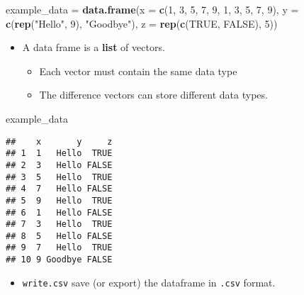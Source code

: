 \documentclass[]{book}
\newenvironment{Shaded}{\begin{snugshade}}{\end{snugshade}}
\newcommand{\DataTypeTok}[1]{\textcolor[rgb]{0.13,0.29,0.53}{#1}}
\newcommand{\DecValTok}[1]{\textcolor[rgb]{0.00,0.00,0.81}{#1}}
\newcommand{\KeywordTok}[1]{\textcolor[rgb]{0.13,0.29,0.53}{\textbf{#1}}}
\newcommand{\NormalTok}[1]{#1}
\newcommand{\OtherTok}[1]{\textcolor[rgb]{0.56,0.35,0.01}{#1}}
\newcommand{\StringTok}[1]{\textcolor[rgb]{0.31,0.60,0.02}{#1}}
\providecommand{\tightlist}{%
  \setlength{\itemsep}{0pt}\setlength{\parskip}{0pt}}
\begin{document}
\begin{Shaded}
\begin{Highlighting}[]
\NormalTok{example_data =}\StringTok{ }\KeywordTok{data.frame}\NormalTok{(}\DataTypeTok{x =} \KeywordTok{c}\NormalTok{(}\DecValTok{1}\NormalTok{, }\DecValTok{3}\NormalTok{, }\DecValTok{5}\NormalTok{, }\DecValTok{7}\NormalTok{, }\DecValTok{9}\NormalTok{, }\DecValTok{1}\NormalTok{, }\DecValTok{3}\NormalTok{, }\DecValTok{5}\NormalTok{, }\DecValTok{7}\NormalTok{, }\DecValTok{9}\NormalTok{),}
                          \DataTypeTok{y =} \KeywordTok{c}\NormalTok{(}\KeywordTok{rep}\NormalTok{(}\StringTok{"Hello"}\NormalTok{, }\DecValTok{9}\NormalTok{), }\StringTok{"Goodbye"}\NormalTok{),}
                          \DataTypeTok{z =} \KeywordTok{rep}\NormalTok{(}\KeywordTok{c}\NormalTok{(}\OtherTok{TRUE}\NormalTok{, }\OtherTok{FALSE}\NormalTok{), }\DecValTok{5}\NormalTok{))}
\end{Highlighting}
\end{Shaded}

\begin{itemize}
\tightlist
\item
  A data frame is a \textbf{list} of vectors.

  \begin{itemize}
  \tightlist
  \item
    Each vector must contain the same data type
  \item
    The difference vectors can store different data types.
  \end{itemize}
\end{itemize}

\begin{Shaded}
\begin{Highlighting}[]
\NormalTok{example_data}
\end{Highlighting}
\end{Shaded}

\begin{verbatim}
##    x       y     z
## 1  1   Hello  TRUE
## 2  3   Hello FALSE
## 3  5   Hello  TRUE
## 4  7   Hello FALSE
## 5  9   Hello  TRUE
## 6  1   Hello FALSE
## 7  3   Hello  TRUE
## 8  5   Hello FALSE
## 9  7   Hello  TRUE
## 10 9 Goodbye FALSE
\end{verbatim}

\begin{itemize}
\tightlist
\item
  \texttt{write.csv} save (or export) the dataframe in \texttt{.csv} format.
\end{itemize}
\end{document}
